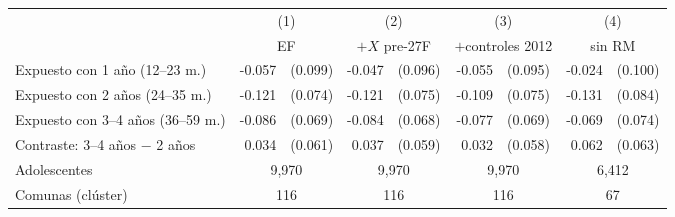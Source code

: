 \begin{tabular}{l rl rl rl rl}
\toprule
 & \multicolumn{2}{c}{(1)} & \multicolumn{2}{c}{(2)} & \multicolumn{2}{c}{(3)} & \multicolumn{2}{c}{(4)} \\
 & \multicolumn{2}{c}{EF} & \multicolumn{2}{c}{$+X$ pre-27F} & \multicolumn{2}{c}{$+$controles 2012} & \multicolumn{2}{c}{sin RM} \\
\midrule
Expuesto con 1 a\~no (12--23 m.) & -0.057 & (0.099) & -0.047 & (0.096) & -0.055 & (0.095) & -0.024 & (0.100) \\
Expuesto con 2 a\~nos (24--35 m.) & -0.121 & (0.074) & -0.121 & (0.075) & -0.109 & (0.075) & -0.131 & (0.084) \\
Expuesto con 3--4 a\~nos (36--59 m.) & -0.086 & (0.069) & -0.084 & (0.068) & -0.077 & (0.069) & -0.069 & (0.074) \\
\addlinespace
Contraste: 3--4 a\~nos $-$ 2 a\~nos & 0.034 & (0.061) & 0.037 & (0.059) & 0.032 & (0.058) & 0.062 & (0.063) \\
\midrule
Adolescentes & \multicolumn{2}{c}{9,970} & \multicolumn{2}{c}{9,970} & \multicolumn{2}{c}{9,970} & \multicolumn{2}{c}{6,412} \\
Comunas (cl\'uster) & \multicolumn{2}{c}{116} & \multicolumn{2}{c}{116} & \multicolumn{2}{c}{116} & \multicolumn{2}{c}{67} \\
\bottomrule
\end{tabular}
